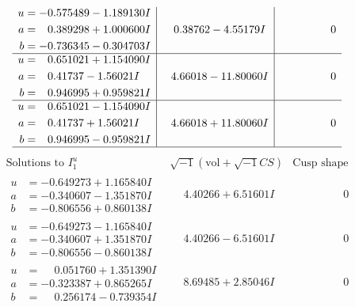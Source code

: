 \documentclass[1p]{elsarticle_modified}
\theoremstyle{definition}
\newcommand{\I}{\sqrt{-1}}
\begin{document}
$$\begin{array}{c|c|c}
\begin{aligned}
u &= -0.575489 - 1.189130 I \\
a &= \phantom{-}0.389298 + 1.000600 I \\
b &= -0.736345 - 0.304703 I\end{aligned}
 & \phantom{-}0.38762 - 4.55179 I & \phantom{-0.000000 } 0 \\ \hline\begin{aligned}
u &= \phantom{-}0.651021 + 1.154090 I \\
a &= \phantom{-}0.41737 - 1.56021 I \\
b &= \phantom{-}0.946995 + 0.959821 I\end{aligned}
 & \phantom{-}4.66018 - 11.80060 I & \phantom{-0.000000 } 0 \\ \hline\begin{aligned}
u &= \phantom{-}0.651021 - 1.154090 I \\
a &= \phantom{-}0.41737 + 1.56021 I \\
b &= \phantom{-}0.946995 - 0.959821 I\end{aligned}
 & \phantom{-}4.66018 + 11.80060 I & \phantom{-0.000000 } 0\\
 \hline 
 \end{array}$$\newpage$$\begin{array}{c|c|c}  
\text{Solutions to }I^u_{1}& \I (\text{vol} + \sqrt{-1}CS) & \text{Cusp shape}\\
 \hline 
\begin{aligned}
u &= -0.649273 + 1.165840 I \\
a &= -0.340607 - 1.351870 I \\
b &= -0.806556 + 0.860138 I\end{aligned}
 & \phantom{-}4.40266 + 6.51601 I & \phantom{-0.000000 } 0 \\ \hline\begin{aligned}
u &= -0.649273 - 1.165840 I \\
a &= -0.340607 + 1.351870 I \\
b &= -0.806556 - 0.860138 I\end{aligned}
 & \phantom{-}4.40266 - 6.51601 I & \phantom{-0.000000 } 0 \\ \hline\begin{aligned}
u &= \phantom{-}0.051760 + 1.351390 I \\
a &= -0.323387 + 0.865265 I \\
b &= \phantom{-}0.256174 - 0.739354 I\end{aligned}
 & \phantom{-}8.69485 + 2.85046 I & \phantom{-0.000000 } 0 \\ \hline\begin{aligned}

\end{aligned}
\end{array}$$
\end{document}
